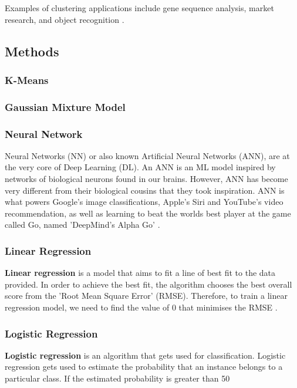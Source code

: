 	Examples of clustering applications include gene sequence analysis, market research, and object recognition \cite{matlanintrotoml}.
	
	
	\subsection{Methods}
	
	\subsubsection{K-Means}
	\subsubsection{Gaussian Mixture Model}
	\subsubsection{Neural Network}
	Neural Networks (NN) or also known Artificial Neural Networks (ANN), are at the very core of Deep Learning (DL). An ANN is an ML model inspired by networks of biological neurons found in our brains. However, ANN has become very different from their biological cousins that they took inspiration. ANN is what powers Google's image classifications, Apple's Siri and YouTube's video recommendation, as well as learning to beat the worlds best player at the game called Go, named 'DeepMind's Alpha Go' \cite{geron2019hands}.
	
	\subsubsection{Linear Regression}
	\textbf{Linear regression} is a model that aims to fit a line of best fit to the data provided. In order to achieve the best fit, the algorithm chooses the best overall score from the 'Root Mean Square Error' (RMSE). Therefore, to train a linear regression model, we need to find the value of $0$ that minimises the RMSE \cite{geron2019hands}.
	
	\subsubsection{Logistic Regression}
	\textbf{Logistic regression} is an algorithm that gets used for classification. Logistic regression gets used to estimate the probability that an instance belongs to a particular class. If the estimated probability is greater than 50%
	
